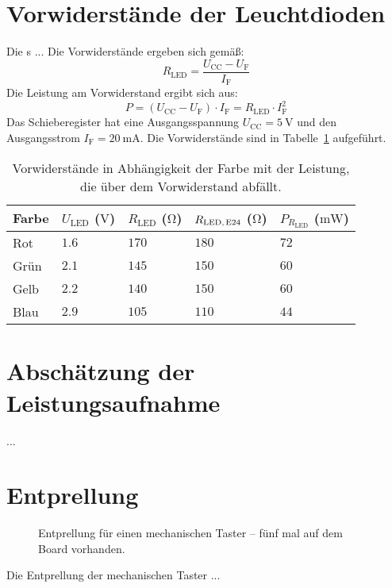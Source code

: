 \documentclass[12pt,fleqn,parskip=half,twoside,toc=index,headings=small,a4paper]{scrreprt}
\begin{document}
	\section{Vorwiderstände der Leuchtdioden}
	Die s ...
	Die Vorwiderstände ergeben sich gemäß:
	\begin{equation}
	R_{\text{LED}} = \frac{U_\text{CC} - U_\text{F}}{I_\text{F}}
	\end{equation}
	Die Leistung am Vorwiderstand ergibt sich aus:
	\begin{equation}
	P = (U_\text{CC} - U_\text{F}) \cdot I_\text{F} = R_{\text{LED}} \cdot I_\text{F}^2 
	\end{equation}
	Das Schieberegister hat eine Ausgangsspannung $U_\text{CC} = \SI{5}{\volt}$ und den Ausgangsstrom $I_\text{F} = \SI{20}{\milli\ampere}$.
	Die Vorwiderstände sind in Tabelle~\ref{tab:Rled} aufgeführt.
	\begin{table}[H]
		\caption{Vorwiderstände in Abhängigkeit der Farbe mit der Leistung, die über dem Vorwiderstand abfällt. }
		\label{tab:Rled}
		\centering
		\begin{tabular}{@{}lllll@{}}
		\toprule
			Farbe	& 	$U_\text{LED}$ ($\si{\volt}$)	& 	$R_\text{LED}$ ($\si{\ohm}$)	& 	$R_\text{LED,\,E24}$ ($\si{\ohm}$) 	&	$P_{R_\text{LED}}$ ($\si{\mW}$)		\\
		\midrule
			Rot		&	$\num{1.6}$			&	$\num{170}$		&	$\num{180}$			&	$\num{72}$	\\
			Grün	&	$\num{2.1}$			&	$\num{145}$		&	$\num{150}$			&	$\num{60}$	\\
			Gelb	&	$\num{2.2}$			&	$\num{140}$		&	$\num{150}$			&	$\num{60}$	\\
			Blau	&	$\num{2.9}$			&	$\num{105}$		&	$\num{110}$			&	$\num{44}$	\\
		\bottomrule
		\end{tabular}
	\end{table}
	\section{Abschätzung der Leistungsaufnahme}
	...
	\section{Entprellung}
	\begin{figure}[h]
		\centering
		\caption{Entprellung für einen mechanischen Taster -- fünf mal auf dem Board vorhanden.}
	\end{figure}
	Die Entprellung der mechanischen Taster ...
	
\end{document}
